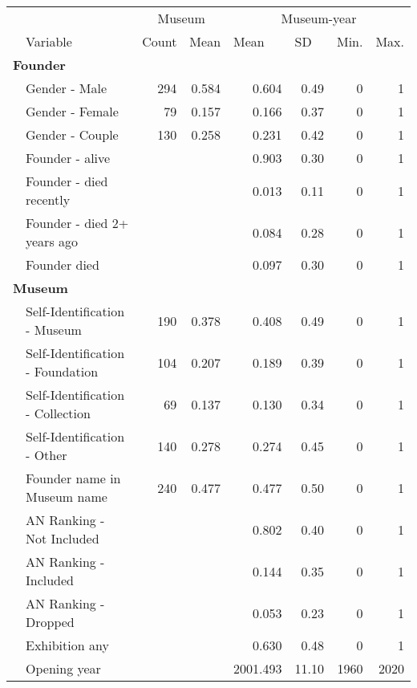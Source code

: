 \documentclass[12pt]{article}
\begin{document}
\begin{table}[ht]
\centering
\begin{tabular}{llrrrrrr}
  \hline
 & & \multicolumn{2}{c}{Museum} & \multicolumn{4}{c}{Museum-year} \\ 
\cmidrule(r){3-4}\cmidrule(r){5-8} \multicolumn{1}{l}{} & \multicolumn{1}{l}{Variable} & \multicolumn{1}{l}{Count} & \multicolumn{1}{l}{Mean} & \multicolumn{1}{l}{Mean} & \multicolumn{1}{l}{SD} & \multicolumn{1}{l}{Min.} & \multicolumn{1}{l}{Max.}\\ 
 \hline
  \multicolumn{8}{l}{\textbf{Founder}} \\ 
 & Gender - Male & 294 & 0.584 &    0.604 &  0.49 & 0 & 1 \\ 
   & Gender - Female & 79 & 0.157 &    0.166 &  0.37 & 0 & 1 \\ 
   & Gender - Couple & 130 & 0.258 &    0.231 &  0.42 & 0 & 1 \\ 
   & Founder - alive &  &  &    0.903 &  0.30 & 0 & 1 \\ 
   & Founder - died recently &  &  &    0.013 &  0.11 & 0 & 1 \\ 
   & Founder - died 2+ years ago &  &  &    0.084 &  0.28 & 0 & 1 \\ 
   & Founder died &  &  &    0.097 &  0.30 & 0 & 1 \\ 
   \multicolumn{8}{l}{\textbf{Museum}} \\ 
 & Self-Identification - Museum & 190 & 0.378 &    0.408 &  0.49 & 0 & 1 \\ 
   & Self-Identification - Foundation & 104 & 0.207 &    0.189 &  0.39 & 0 & 1 \\ 
   & Self-Identification - Collection & 69 & 0.137 &    0.130 &  0.34 & 0 & 1 \\ 
   & Self-Identification - Other & 140 & 0.278 &    0.274 &  0.45 & 0 & 1 \\ 
   & Founder name in Museum name & 240 & 0.477 &    0.477 &  0.50 & 0 & 1 \\ 
   & AN Ranking - Not Included &  &  &    0.802 &  0.40 & 0 & 1 \\ 
   & AN Ranking - Included &  &  &    0.144 &  0.35 & 0 & 1 \\ 
   & AN Ranking - Dropped &  &  &    0.053 &  0.23 & 0 & 1 \\ 
   & Exhibition any &  &  &    0.630 &  0.48 & 0 & 1 \\ 
   & Opening year &  &  & 2001.493 & 11.10 & 1960 & 2020 \\ 

\end{tabular}
\end{table}
\end{document}
